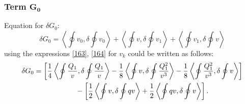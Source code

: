 \documentclass[pdftex]{sigma}
\numberwithin{equation}{section}
\theoremstyle{definition}
\begin{document}
\subsubsection[Term G\_0]{Term $\boldsymbol{G_0}$}
Equation for $\delta G_{0}$:
\begin{equation*}%
\delta G_{0}=\left\langle \oint v_0,\delta \oint v_0\right\rangle +\left\langle \oint v,\delta \oint v_1\right\rangle +\left\langle \oint v_1,\delta \oint v\right\rangle \end{equation*}
using the expressions \eqref{163}, \eqref{164} for $v_k$ could be written as follows:
\begin{gather}
\delta G_{0}=\left[\frac{1}{4}\left\langle \oint \frac{Q_1}{v}, \delta \oint \frac{Q_1}{v}\right\rangle -\frac{1}{8}\left\langle \oint v,\delta \oint \frac{Q^2_1}{v^3}\right\rangle -\frac{1}{8}\left\langle \oint \frac{Q^2_1}{v^3},\delta \oint v\right\rangle \right] \nonumber\\
\hphantom{\delta G_{0}=}{}
 -\left[\frac{1}{2}\left\langle \oint v,\delta \oint qv\right\rangle +\frac{1}{2}\left\langle \oint qv,\delta \oint v\right\rangle \right].\label{172}
\end{gather}
\end{document}
